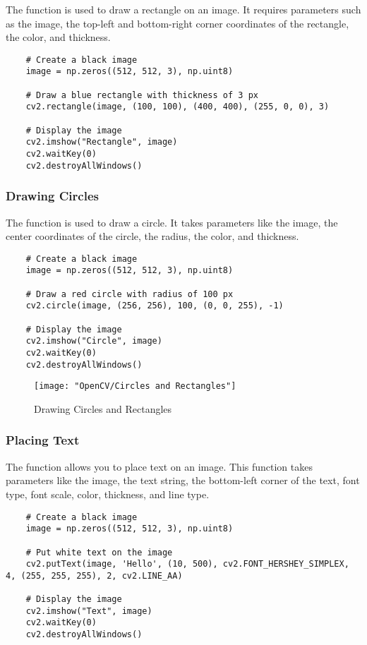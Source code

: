 The  function is used to draw a rectangle on an image. It requires parameters such as the image, the top-left and bottom-right corner coordinates of the rectangle, the color, and thickness.\cite{OpenCVTeam:2024}

\begin{lstlisting}
	# Create a black image
	image = np.zeros((512, 512, 3), np.uint8)
	
	# Draw a blue rectangle with thickness of 3 px
	cv2.rectangle(image, (100, 100), (400, 400), (255, 0, 0), 3)
	
	# Display the image
	cv2.imshow("Rectangle", image)
	cv2.waitKey(0)
	cv2.destroyAllWindows()
\end{lstlisting}

\subsubsection{Drawing Circles}

The  function is used to draw a circle. It takes parameters like the image, the center coordinates of the circle, the radius, the color, and thickness.\cite{OpenCVTeam:2024}

\begin{lstlisting}
	# Create a black image
	image = np.zeros((512, 512, 3), np.uint8)
	
	# Draw a red circle with radius of 100 px
	cv2.circle(image, (256, 256), 100, (0, 0, 255), -1)
	
	# Display the image
	cv2.imshow("Circle", image)
	cv2.waitKey(0)
	cv2.destroyAllWindows()
\end{lstlisting}


\begin{figure}[h]
	\centering
	\texttt{[image: "OpenCV/Circles and Rectangles"]}
	\caption{Drawing Circles and Rectangles}\label{Circles and Rectangles}
\end{figure}

\subsubsection{Placing Text}

The  function allows you to place text on an image. This function takes parameters like the image, the text string, the bottom-left corner of the text, font type, font scale, color, thickness, and line type.\cite{Jasmcaus:2024}

\begin{lstlisting}
	# Create a black image
	image = np.zeros((512, 512, 3), np.uint8)
	
	# Put white text on the image
	cv2.putText(image, 'Hello', (10, 500), cv2.FONT_HERSHEY_SIMPLEX, 4, (255, 255, 255), 2, cv2.LINE_AA)
	
	# Display the image
	cv2.imshow("Text", image)
	cv2.waitKey(0)
	cv2.destroyAllWindows()
\end{lstlisting}

